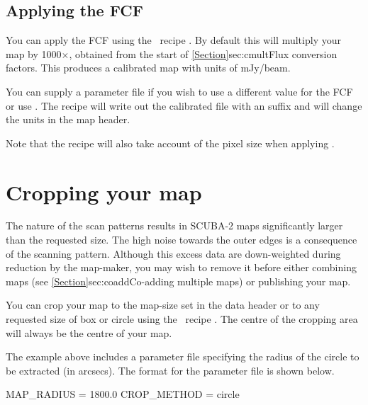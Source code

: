 \documentclass[11pt,oneside,chapters]{starlink}
\begin{document}
\subsection{Applying the FCF}

You can apply the FCF using the \picard\ recipe
.
By default this will multiply your map by
1000$\times$\fcfb, obtained from the start of
\cref{Section}{sec:cmult}{Flux conversion factors}. This produces a
calibrated map with units of mJy/beam.

You can supply a parameter file if you wish to use a different value
for the FCF or use \fcfa. The recipe will write out the calibrated
file with an  suffix and will change the units in the
map header.

\begin{terminalv}
\end{terminalv}
Note that the recipe will also take account of the pixel size when
applying \fcfa.


\section{Cropping your map}
\label{sec:crop}

The nature of the scan patterns results in SCUBA-2 maps significantly
larger than the requested size. The high noise towards the outer edges
is a consequence of the scanning pattern. Although this excess data are
down-weighted during reduction by the map-maker, you may wish to remove
it before either combining maps (see
\cref{Section}{sec:coadd}{Co-adding multiple maps}) or publishing your
map.

You can crop your map to the map-size set in the data header or
to any requested size of box or circle using the \picard\ recipe
.
The centre of the cropping area will always be the centre of your map.
\begin{terminalv}
\end{terminalv}
The example above includes a parameter file specifying the radius of
the circle to be extracted (in arcsecs).  The format for the parameter
file is shown below.
\begin{terminalv}
MAP_RADIUS = 1800.0
CROP_METHOD = circle
\end{terminalv}
\end{document}
